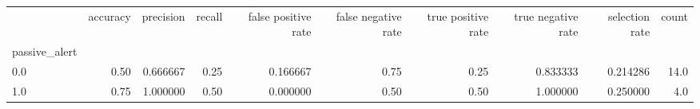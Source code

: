 \begin{tabular}{lrrrrrrrrr}
\toprule
{} &  accuracy &  precision &  recall &  false positive rate &  false negative rate &  true positive rate &  true negative rate &  selection rate &  count \\
passive\_alert &           &            &         &                      &                      &                     &                     &                 &        \\
\midrule
0.0           &      0.50 &   0.666667 &    0.25 &             0.166667 &                 0.75 &                0.25 &            0.833333 &        0.214286 &   14.0 \\
1.0           &      0.75 &   1.000000 &    0.50 &             0.000000 &                 0.50 &                0.50 &            1.000000 &        0.250000 &    4.0 \\
\bottomrule
\end{tabular}
